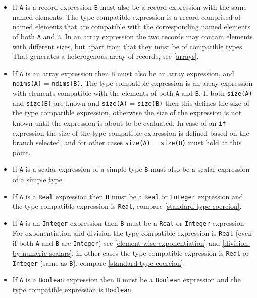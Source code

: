 \begin{itemize}
\item
  If \lstinline!A! is a record expression \lstinline!B! must also be a record expression with the same named elements.
  The type compatible expression is a record comprised of named elements that are compatible with the corresponding named elements of both \lstinline!A! and \lstinline!B!.
  In an array expression the two records may contain elements with different sizes, but apart from that they must be of compatible types.
  That generates a heterogenous array of records, see \cref{arrays}.
\item
  If \lstinline!A! is an array expression then \lstinline!B! must also be an array expression, and \lstinline!ndims(A)! = \lstinline!ndims(B)!.
  The type compatible expression is an array expression with elements compatible with the elements of both \lstinline!A! and \lstinline!B!.
  If both \lstinline!size(A)! and \lstinline!size(B)! are known and \lstinline!size(A)! = \lstinline!size(B)! then this defines the size of the type compatible expression, otherwise the size of the expression is not known until the expression is about to be evaluated.
  In case of an \lstinline!if!-expression the size of the type compatible expression is defined based on the branch selected, and for other cases \lstinline!size(A)! = \lstinline!size(B)! must hold at this point.
\item
  If \lstinline!A! is a scalar expression of a simple type \lstinline!B! must also be a scalar expression of a simple type.
\item
  If \lstinline!A! is a \lstinline!Real! expression then \lstinline!B! must be a \lstinline!Real! or \lstinline!Integer! expression and the type compatible expression is \lstinline!Real!, compare \cref{standard-type-coercion}.
\item
  If \lstinline!A! is an \lstinline!Integer! expression then \lstinline!B! must be a \lstinline!Real! or \lstinline!Integer! expression.
  For exponentiation and division the type compatible expression is \lstinline!Real! (even if both \lstinline!A! and \lstinline!B! are \lstinline!Integer!) see \cref{element-wise-exponentiation} and \cref{division-by-numeric-scalars}, in other cases the type compatible expression is \lstinline!Real! or \lstinline!Integer! (same as \lstinline!B!), compare \cref{standard-type-coercion}.
\item
  If \lstinline!A! is a \lstinline!Boolean! expression then \lstinline!B! must be a \lstinline!Boolean! expression and the type compatible expression is \lstinline!Boolean!.

\end{itemize}
